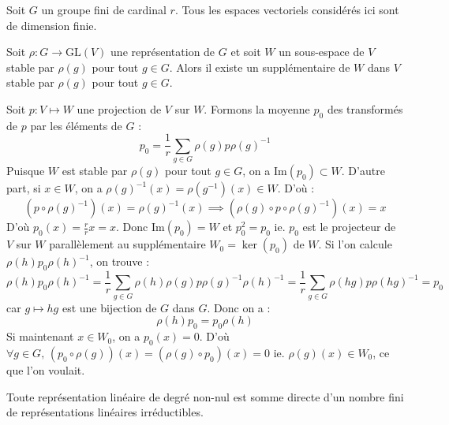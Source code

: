 





	Soit $G$ un groupe fini de cardinal $r$. Tous les espaces vectoriels considérés ici sont de dimension finie.

	\medskip

	\begin{lemma}
		\label{theoreme-de-maschke-1}
		Soit $\rho : G \rightarrow \mathrm{GL}(V)$ une représentation de $G$ et soit $W$ un sous-espace de $V$ stable par $\rho(g)$ pour tout $g \in G$. Alors il existe un supplémentaire de $W$ dans $V$ stable par $\rho(g)$ pour tout $g \in G$.
	\end{lemma}

	\begin{demonstration}
		Soit $p : V \mapsto W$ une projection de $V$ sur $W$. Formons la moyenne $p_0$ des transformés de $p$ par les éléments de $G$ :
		\[ p_0 = \frac{1}{r} \sum_{g \in G} \rho(g) p \rho(g)^{-1} \]
		Puisque $W$ est stable par $\rho(g)$ pour tout $g \in G$, on a $\mathrm{Im}(p_0) \subset W$.
		\newpar
		D'autre part, si $x \in W$, on a $\rho(g)^{-1}(x) = \rho(g^{-1})(x) \in W$. D'où :
		\[ (p \circ \rho(g)^{-1})(x) = \rho(g)^{-1}(x) \implies (\rho(g) \circ p \circ \rho(g)^{-1})(x) = x \]
		D'où $p_0(x) = \frac{r}{r} x = x$. Donc $\mathrm{Im}(p_0) = W$ et $p_0^2 = p_0$ ie. $p_0$ est le projecteur de $V$ sur $W$ parallèlement au supplémentaire $W_0 = \ker{(p_0)}$ de $W$.
		\newpar
		Si l'on calcule $\rho(h) p_0 \rho(h)^{-1}$, on trouve :
		\[ \rho(h) p_0 \rho(h)^{-1} = \frac{1}{r} \sum_{g \in G} \rho(h) \rho(g) p \rho(g)^{-1} \rho(h)^{-1} = \frac{1}{r} \sum_{g \in G} \rho(hg) p \rho(hg)^{-1} = p_0 \]
		car $g \mapsto hg$ est une bijection de $G$ dans $G$. Donc on a :
		\[ \rho(h) p_0 = p_0 \rho(h) \]
		Si maintenant $x \in W_0$, on a $p_0(x) = 0$. D'où $\forall g \in G, \, (p_0 \circ \rho(g))(x) = (\rho(g) \circ p_0)(x) = 0$ ie. $\rho(g)(x) \in W_0$, ce que l'on voulait.
	\end{demonstration}

	\begin{theorem}[Maschke]
		Toute représentation linéaire de degré non-nul est somme directe d'un nombre fini de représentations linéaires irréductibles.
	\end{theorem}

